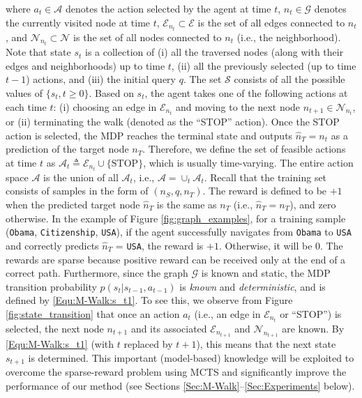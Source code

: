 \documentclass{article}
\newcommand{\defeq}{\triangleq}
\newcommand{\mc}{\mathcal}
\newcommand{\modelname}{M-Walk}
\begin{document}
    \noindent where $a_t \in \mc{A}$ denotes the action selected by the agent at time $t$, $n_t \in \mc{G}$ denotes the currently visited node at time $t$,  $\mc{E}_{n_t} \subset \mc{E}$ is the set of all edges connected to $n_t$, and $\mc{N}_{n_t} \subset \mc{N}$ is the set of all nodes connected to $n_t$ (i.e., the neighborhood). Note that state $s_t$ is a collection of (i) all the traversed nodes (along with their edges and neighborhoods) up to time $t$, (ii) all the previously selected (up to time $t-1$) actions, and (iii) the initial query $q$. The set $\mc{S}$ consists of all the possible values of $\{s_t, t \ge 0\}$. Based on $s_t$, the agent takes one of the following actions at each time $t$: (i) choosing an edge in $\mc{E}_{n_{t}}$ and moving to the next node $n_{t+1} \in \mc{N}_{n_{t}}$, or (ii) terminating the walk (denoted as the ``STOP'' action). Once the STOP action is selected, the MDP reaches the terminal state and outputs $\hat{n}_T = n_{t}$ as a prediction of the target node $n_T$. Therefore, we define the set of feasible actions at time $t$ as $\mc{A}_t \defeq \mc{E}_{n_t} \cup \{ \mathrm{STOP}\}$, which is usually time-varying. The entire action space $\mc{A}$ is the union of all $\mc{A}_t$, i.e., $\mc{A} = \cup_t \mc{A}_t$. Recall that the training set consists of samples in the form of $(n_S, q, n_T)$. The reward is defined to be $+1$ when the predicted target node $\hat{n}_T$ is the same as $n_T$ (i.e., $\hat{n}_T = n_T$), and zero otherwise. In the example of Figure \ref{fig:graph_examples}, for a training sample (\texttt{Obama}, \texttt{Citizenship}, \texttt{USA}), if the agent successfully navigates from \texttt{Obama} to \texttt{USA} and correctly predicts $\hat{n}_T$ = \texttt{USA}, the reward is $+1$. Otherwise, it will be $0$. The rewards are sparse because positive reward can be received only at the end of a correct path. Furthermore, since the graph $\mc{G}$ is known and static, the MDP transition probability $p(s_{t} | s_{t-1}, a_{t-1})$ is \emph{known} and \emph{deterministic}, and is defined by \eqref{Equ:\modelname:s_t1}. To see this, we observe from Figure \ref{fig:state_transition} that once an action $a_t$ (i.e., an edge in $\mc{E}_{n_t}$ or ``STOP'') is selected, the next node $n_{t+1}$ and its associated $\mc{E}_{n_{t+1}}$ and $\mc{N}_{n_{t+1}}$ are known. By \eqref{Equ:\modelname:s_t1} (with $t$ replaced by $t+1$), this means that the next state $s_{t+1}$ is determined. This important (model-based) knowledge will be exploited to overcome the sparse-reward problem using MCTS and significantly improve the performance of our method (see Sections \ref{Sec:\modelname}--\ref{Sec:Experiments} below). 
    
\end{document}
